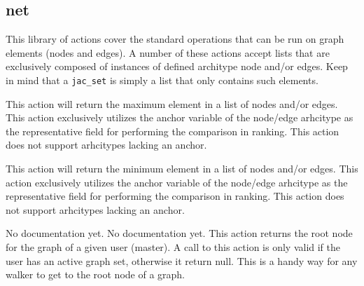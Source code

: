 \subsection{net}
\par
This library of actions cover the standard operations that can be
run on graph elements (nodes and edges). A number of these actions
accept lists that are exclusively composed of instances of defined
architype node and/or edges. Keep in mind that a \lstinline{jac_set}
is simply a list that only contains such elements.
{This action will return the maximum element in a list of nodes
and/or edges. This action exclusively utilizes the anchor variable
of the node/edge arhcitype as the representative field for
performing the  comparison in ranking. This action does not support
arhcitypes lacking an anchor.\vspace{4mm}\par
{}\vspace{4mm}\par
{}}
{This action will return the minimum element in a list of nodes
and/or edges. This action exclusively utilizes the anchor variable
of the node/edge arhcitype as the representative field for
performing the  comparison in ranking. This action does not support
arhcitypes lacking an anchor.\vspace{4mm}\par
{}\vspace{4mm}\par
{}}
{No documentation yet.}
{No documentation yet.}
{This action returns the root node for the graph of a given user (master). A call
to this action is only valid if the user has an active graph set, otherwise it
return null. This is a handy way for any walker to get to the root node of a
graph.}
